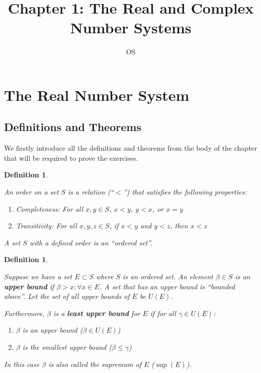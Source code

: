 \documentclass[12pt]{article}
\title{Chapter 1: The Real and Complex Number Systems}
\author{OS}
\newtheorem{definition}[theorem]{Definition}
\begin{document}

\section{The Real Number System}

\subsection{Definitions and Theorems}

We firstly introduce all the definitions and theorems from the body of the chapter that will be required to prove the exercises.

\begin{definition}
    
    \label{order}
    
    An order on a set $S$ is a relation (``$<$'') that satisfies the following properties:
    
    \begin{enumerate}
        \item Completeness: For all $x, y \in S$, $x < y$, $y < x$, or $x = y$
        \item Transitivity: For all $x, y, z \in S$, if $x < y$ and $y < z$, then $x < z$
    \end{enumerate}
    
    A set $S$ with a defined order is an ``ordered set''.
    
\end{definition}

\begin{definition}

    \label{bound}

    Suppose we have a set $E \subset S$ where $S$ is an ordered set. An element $\beta \in S$ is an \textbf{upper bound} if $\beta > x: \forall x \in E$. A set that has an upper bound is ``bounded above''. Let the set of all upper bounds of $E$ be $U(E)$.
    
    Furthermore, $\beta$ is a \textbf{least upper bound} for $E$ if for all $\gamma \in U(E)$:
    
    \begin{enumerate}
        \item $\beta$ is an upper bound ($\beta \in U(E)$)
        \item $\beta$ is the smallest upper bound ($\beta \leq \gamma$)
    \end{enumerate}
    
    In this case $\beta$ is also called the supremum of $E$ ($\sup(E)$).
    
\end{definition}
\end{document}
